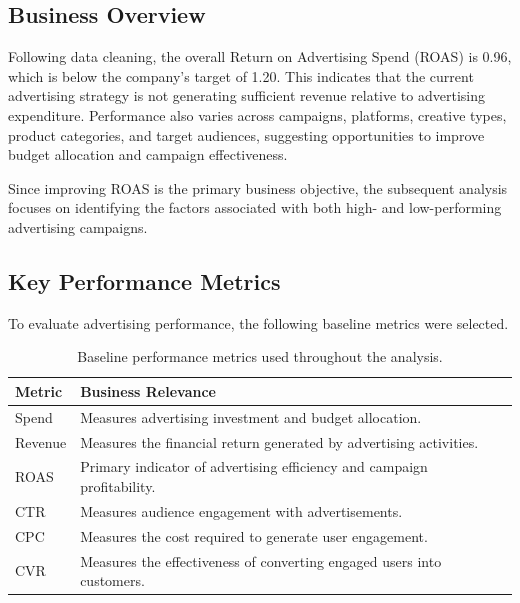 \subsection{Business Overview}

Following data cleaning, the overall Return on Advertising Spend (ROAS) is 0.96, which is below the company's target of 1.20. This indicates that the current advertising strategy is not generating sufficient revenue relative to advertising expenditure. Performance also varies across campaigns, platforms, creative types, product categories, and target audiences, suggesting opportunities to improve budget allocation and campaign effectiveness.

Since improving ROAS is the primary business objective, the subsequent analysis focuses on identifying the factors associated with both high- and low-performing advertising campaigns.

\subsection{Key Performance Metrics}

To evaluate advertising performance, the following baseline metrics were selected.

\begin{table}[H]
	\centering
	\begin{tabular}{lp{10cm}}
		\toprule
		Metric & Business Relevance\\
		\midrule
		Spend & Measures advertising investment and budget allocation.\\
		
		Revenue & Measures the financial return generated by advertising activities.\\
		
		ROAS & Primary indicator of advertising efficiency and campaign profitability.\\
		
		CTR & Measures audience engagement with advertisements.\\
		
		CPC & Measures the cost required to generate user engagement.\\
		
		CVR & Measures the effectiveness of converting engaged users into customers.\\
		
		\bottomrule
	\end{tabular}
	\caption{Baseline performance metrics used throughout the analysis.}
\end{table}

